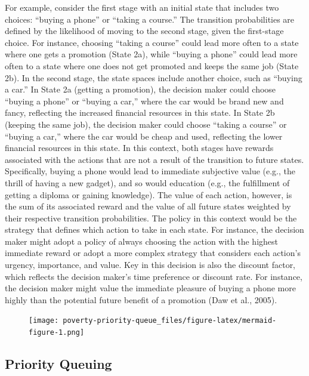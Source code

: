 \documentclass[
]{report}
\begin{document}
For example, consider the first stage with an initial state that
includes two choices: ``buying a phone'' or ``taking a course.'' The
transition probabilities are defined by the likelihood of moving to the
second stage, given the first-stage choice. For instance, choosing
``taking a course'' could lead more often to a state where one gets a
promotion (State 2a), while ``buying a phone'' could lead more often to
a state where one does not get promoted and keeps the same job (State
2b). In the second stage, the state spaces include another choice, such
as ``buying a car.'' In State 2a (getting a promotion), the decision
maker could choose ``buying a phone'' or ``buying a car,'' where the car
would be brand new and fancy, reflecting the increased financial
resources in this state. In State 2b (keeping the same job), the
decision maker could choose ``taking a course'' or ``buying a car,''
where the car would be cheap and used, reflecting the lower financial
resources in this state. In this context, both stages have rewards
associated with the actions that are not a result of the transition to
future states. Specifically, buying a phone would lead to immediate
subjective value (e.g., the thrill of having a new gadget), and so would
education (e.g., the fulfillment of getting a diploma or gaining
knowledge). The value of each action, however, is the sum of its
associated reward and the value of all future states weighted by their
respective transition probabilities. The policy in this context would be
the strategy that defines which action to take in each state. For
instance, the decision maker might adopt a policy of always choosing the
action with the highest immediate reward or adopt a more complex
strategy that considers each action's urgency, importance, and value.
Key in this decision is also the discount factor, which reflects the
decision maker's time preference or discount rate. For instance, the
decision maker might value the immediate pleasure of buying a phone more
highly than the potential future benefit of a promotion (Daw et al.,
2005).

\begin{figure}[H]

{\centering \texttt{[image: poverty-priority-queue\_files/figure-latex/mermaid-figure-1.png]}

}

\end{figure}

\hypertarget{priority-queuing}{%
\subsection{Priority Queuing}\label{priority-queuing}}
\end{document}
